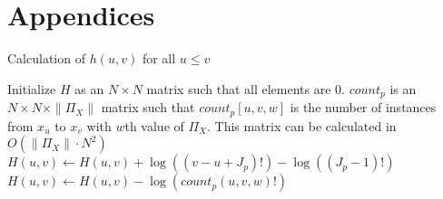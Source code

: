 




\section*{Appendices}

\begin{algorithm}
  \caption{ Calculation of $h(u,v)$ for all $u \leq v$}
  \label{alg:h}
  \begin{algorithmic}[1]
  \State Initialize $H$ as an $N \times N$ matrix such that all elements are 0.
  \State $count_p$ is an $N \times N \times \|\Pi_X\|$ matrix such that $count_p [u,v,w]$ is the number of instances from $x_u$ to $x_v$ with $w$th value of $\Pi_X$. This matrix can be calculated in $O(\|\Pi_X\| \cdot N^2)$
      \State $H(u,v) \leftarrow H(u,v) + \log((v-u + J_p)!) - \log((J_p -1)!)$
        \State $H(u,v) \leftarrow H(u,v) - \log( count_p(u,v,w)!)$
      \EndFor
    \EndFor
  \EndFor
    \State {}
  \EndFor
  \end{algorithmic}
\end{algorithm}



